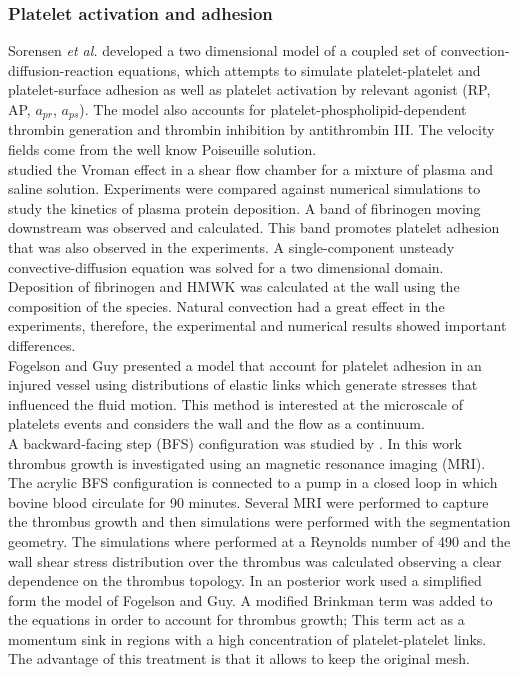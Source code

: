 \documentclass[%
 nofootinbib,
 amsmath,amssymb,
 aps,
 pra,
]{revtex4-1}
\begin{document}
\subsubsection{Platelet activation and adhesion}
Sorensen \textit{et al.} \citep{Sorensen:1999} developed a two dimensional model of a coupled set of convection-diffusion-reaction equations, which attempts to simulate platelet-platelet and platelet-surface adhesion as well as platelet activation by relevant agonist (RP, AP, $a_{pr}$, $a_{ps}$). The model also accounts for platelet-phospholipid-dependent thrombin generation and thrombin inhibition by antithrombin III. The velocity fields come from the well know Poiseuille solution.\\ 
\citet{Mandrusov:1998} studied the Vroman effect in a shear flow chamber for a mixture of plasma and saline solution. Experiments were compared against numerical simulations to study the kinetics of plasma protein deposition. A band of fibrinogen moving downstream was observed and calculated. This band promotes platelet adhesion that was also observed in the experiments. A single-component unsteady convective-diffusion equation was solved for a two dimensional  domain. Deposition of fibrinogen and HMWK was calculated at the wall using the composition of the species. Natural convection had a great effect in the experiments, therefore, the experimental and numerical results showed important differences.\\
Fogelson and Guy \citep{Fogelson:2004} presented a model that account for platelet adhesion in an injured vessel using distributions of elastic links which generate stresses that influenced the fluid motion. This method is interested at the microscale of platelets events and considers the wall and the flow as a continuum.\\
A backward-facing step (BFS) configuration was studied by \citet{Taylor:2014}. In this work thrombus growth is investigated using an magnetic resonance imaging (MRI). The acrylic BFS configuration is connected to a pump in a closed loop in which bovine blood circulate for 90 minutes. Several MRI were performed to capture the thrombus growth and then simulations were performed with the segmentation geometry. The simulations where performed at a Reynolds number of 490 and the wall shear stress distribution over the thrombus was calculated observing a clear dependence on the thrombus topology. In an posterior work \citet{Taylor:2015} used a simplified form the model of Fogelson and Guy\citep{Fogelson:2004}. A modified Brinkman term was added to the equations in order to account for thrombus growth; This term act as a momentum sink in regions with a high concentration of platelet-platelet links. The advantage of this treatment is that it allows to keep the original mesh.\\
\end{document}
